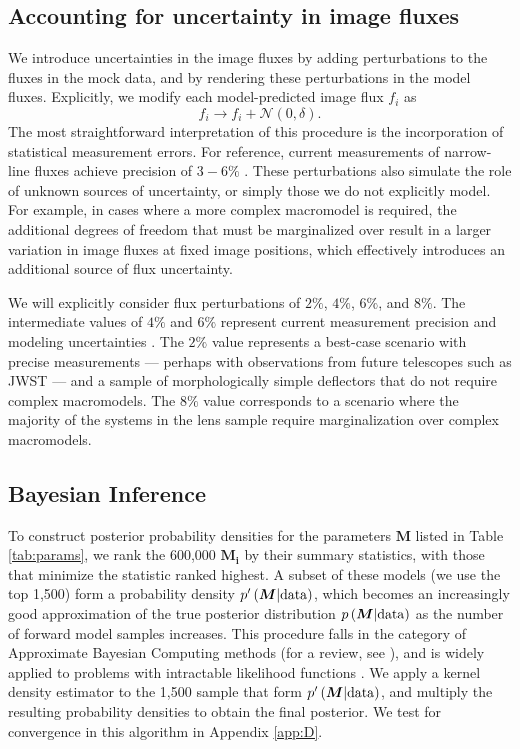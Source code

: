 \subsection{Accounting for uncertainty in image fluxes}
\label{ssec:fluxdelta}
We introduce uncertainties in the image fluxes by adding perturbations to the fluxes in the mock data, and by rendering these perturbations in the model fluxes. Explicitly, we modify each model-predicted image flux $f_i$ as
\begin{equation}
f_i \rightarrow f_i + \mathcal{N} \left(0, \delta \right).
\end{equation} 
The most straightforward interpretation of this procedure is the incorporation of statistical measurement errors. For reference, current measurements of narrow-line fluxes achieve precision of $3-6 \%$ \cite{Nierenberg++14,Nierenberg++17}. These perturbations also simulate the role of unknown sources of uncertainty, or simply those we do not explicitly model. For example, in cases where a more complex macromodel is required, the additional degrees of freedom that must be marginalized over result in a larger variation in image fluxes at fixed image positions, which effectively introduces an additional source of flux uncertainty. 

We will explicitly consider flux perturbations of $2\%$, $4\%$, $6\%$, and $8\%$. The intermediate values of $4\%$ and $6\%$ represent current measurement precision \cite{Nierenberg++17} and modeling uncertainties \cite{Gilman++17}. The $2\%$ value represents a best-case scenario with precise measurements --- perhaps with observations from future telescopes such as JWST --- and a sample of morphologically simple deflectors that do not require complex macromodels. The $8\%$ value corresponds to a scenario where the majority of the systems in the lens sample require marginalization over complex macromodels.  

\subsection{Bayesian Inference}
\label{ssec:forwardmodeling}
To construct posterior probability densities for the parameters $\boldsymbol{M}$ listed in Table \ref{tab:params}, we rank the 600,000 $\boldsymbol{M_i}$ by their summary statistics, with those that minimize the statistic ranked highest. A subset of these models (we use the top 1,500) form a probability density $p^{\prime}\left(\boldsymbol{M} | \rm{data}\right)$, which becomes an increasingly good approximation of the true posterior distribution $p\left(\boldsymbol{M} | \rm{data}\right)$ as the number of forward model samples increases. This procedure falls in the category of Approximate Bayesian Computing methods (for a review, see \cite{Lintusaari++17}), and is widely applied to problems with intractable likelihood functions \cite{Akeret++15,Hahn++17,Birrer++17a,Davies++18}. We apply a kernel density estimator to the 1,500 sample that form $p^{\prime}\left(\boldsymbol{M} | \rm{data}\right)$, and multiply the resulting probability densities to obtain the final posterior. We test for convergence in this algorithm in Appendix \ref{app:D}. 

